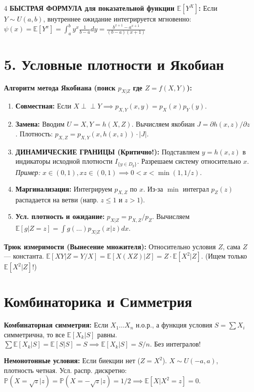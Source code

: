\documentclass[8pt, a4paper, landscape]{extarticle}
\newcommand{\E}{\mathbb{E}}
\renewcommand{\P}{\mathbb{P}}
\begin{document}
\begin{multicols*}{4}
\textbf{БЫСТРАЯ ФОРМУЛА для показательной функции $\E[Y^X]$:}
Если $Y \sim U(a,b)$, внутреннее ожидание интегрируется мгновенно:
$ \psi(x) = \E[Y^x] = \int_a^b y^x \frac{1}{b-a} dy = \frac{b^{x+1}-a^{x+1}}{(b-a)(x+1)} $

\section*{5. Условные плотности и Якобиан}
\textbf{Алгоритм метода Якобиана (поиск $p_{X|Z}$ где $Z=f(X,Y)$):}
\begin{enumerate}
    \item \textbf{Совместная:} Если $X \perp\!\!\perp Y \implies p_{X,Y}(x,y) = p_X(x)p_Y(y)$.
    \item \textbf{Замена:} Вводим $U=X, Y=h(X,Z)$. Вычисляем якобиан $J = \partial h(x,z) / \partial z$. Плотность: $p_{X,Z} = p_{X,Y}(x, h(x,z)) \cdot |J|$.
    \item \textbf{ДИНАМИЧЕСКИЕ ГРАНИЦЫ (Критично!):} Подставляем $y=h(x,z)$ в индикаторы исходной плотности $I_{\{y \in D_y\}}$. Разрешаем систему относительно $x$. \textit{Пример:} $x \in (0,1), xz \in (0,1) \implies 0 < x < \min(1, 1/z)$.
    \item \textbf{Маргинализация:} Интегрируем $p_{X,Z}$ по $x$. Из-за $\min$ интеграл $p_Z(z)$ распадается на ветви (напр. $z \le 1$ и $z > 1$).
    \item \textbf{Усл. плотность и ожидание:} $p_{X|Z} = p_{X,Z}/p_Z$. Вычисляем $\E[g|Z=z] = \int g(\dots) p_{X|Z}(x|z)dx$.
\end{enumerate}

\textbf{Трюк измеримости (Вынесение множителя):}
Относительно условия $Z$, сама $Z$ — константа.
$\E[XY | Z=Y/X] = \E[X(XZ)|Z] = Z \cdot \E[X^2|Z]$. (Ищем только $\E[X^2|Z]$!)

\section*{Комбинаторика и Симметрия}
\textbf{Комбинаторная симметрия:} Если $X_1 \dots X_n$ н.о.р., а функция условия $S = \sum X_i$ симметрична, то все $\E[X_k|S]$ равны.
$\sum \E[X_k|S] = \E[S|S] = S \implies \E[X_k|S] = S/n$. Без интегралов!

\textbf{Немонотонные условия:} Если биекции нет ($Z=X^2$).
$X \sim U(-a,a)$, плотность четная. Усл. распр. дискретно: $\P(X=\sqrt{z}|z) = \P(X=-\sqrt{z}|z) = 1/2 \implies \E[X|X^2=z] = 0$.


\end{multicols*}
\end{document}
